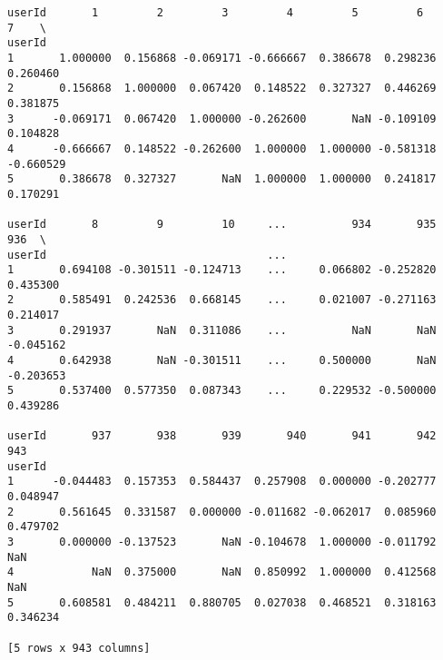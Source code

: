 \documentclass[11pt]{article}
\begin{document}
    
    \begin{verbatim}
userId       1         2         3         4         5         6         7    \
userId                                                                         
1       1.000000  0.156868 -0.069171 -0.666667  0.386678  0.298236  0.260460   
2       0.156868  1.000000  0.067420  0.148522  0.327327  0.446269  0.381875   
3      -0.069171  0.067420  1.000000 -0.262600       NaN -0.109109  0.104828   
4      -0.666667  0.148522 -0.262600  1.000000  1.000000 -0.581318 -0.660529   
5       0.386678  0.327327       NaN  1.000000  1.000000  0.241817  0.170291   

userId       8         9         10     ...          934       935       936  \
userId                                  ...                                    
1       0.694108 -0.301511 -0.124713    ...     0.066802 -0.252820  0.435300   
2       0.585491  0.242536  0.668145    ...     0.021007 -0.271163  0.214017   
3       0.291937       NaN  0.311086    ...          NaN       NaN -0.045162   
4       0.642938       NaN -0.301511    ...     0.500000       NaN -0.203653   
5       0.537400  0.577350  0.087343    ...     0.229532 -0.500000  0.439286   

userId       937       938       939       940       941       942       943  
userId                                                                        
1      -0.044483  0.157353  0.584437  0.257908  0.000000 -0.202777  0.048947  
2       0.561645  0.331587  0.000000 -0.011682 -0.062017  0.085960  0.479702  
3       0.000000 -0.137523       NaN -0.104678  1.000000 -0.011792       NaN  
4            NaN  0.375000       NaN  0.850992  1.000000  0.412568       NaN  
5       0.608581  0.484211  0.880705  0.027038  0.468521  0.318163  0.346234  

[5 rows x 943 columns]
    \end{verbatim}

    
    
\end{document}
